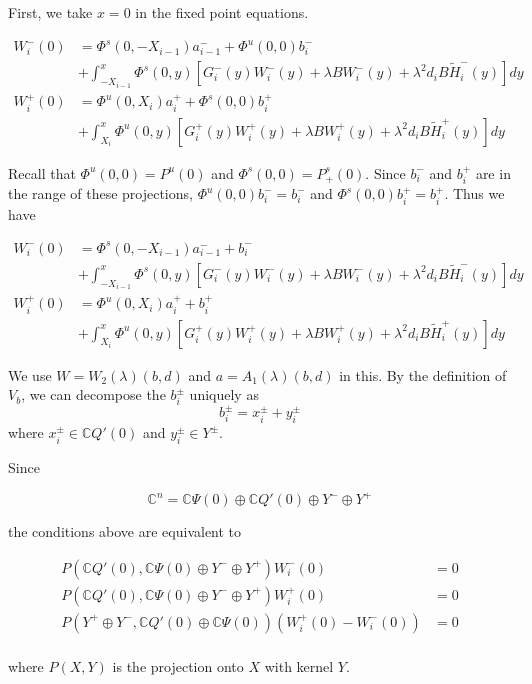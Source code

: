 \documentclass[12pt]{article}
\def\C{{\mathbb C}}
\begin{document}
First, we take $x = 0$ in the fixed point equations.

\begin{align*}
W_i^-(0) &= \Phi^s(0, -X_{i-1})a^-_{i-1} + \Phi^u(0, 0)b_i^- \\
&+ \int_{-X_{i-1}}^x \Phi^s(0, y)[G_i^-(y) W_i^-(y) + \lambda B W_i^-(y) + \lambda^2 d_i B \tilde{H}_i^-(y)] dy \\
W_i^+(0) &= \Phi^u(0, X_i)a^+_{i} + \Phi^s(0, 0)b_i^+ \\
&+ \int_{X_{i}}^x \Phi^u(0, y)[G_i^+(y) W_i^+(y) + \lambda B W_i^+(y) + \lambda^2 d_i B \tilde{H}_i^+(y) ] dy
\end{align*}

Recall that $\Phi^u(0, 0) = P^u(0)$ and $\Phi^s(0, 0) = P^s_+(0)$. Since $b_i^-$ and $b_i^+$ are in the range of these projections, $\Phi^u(0, 0)b_i^- = b_i^-$ and $\Phi^s(0, 0)b_i^+ = b_i^+ $. Thus we have

\begin{align*}
W_i^-(0) &= \Phi^s(0, -X_{i-1})a^-_{i-1} + b_i^- \\
&+ \int_{-X_{i-1}}^x \Phi^s(0, y)[G_i^-(y) W_i^-(y) + \lambda B W_i^-(y) + \lambda^2 d_i B \tilde{H}_i^-(y)] dy \\
W_i^+(0) &= \Phi^u(0, X_i)a^+_{i} + b_i^+ \\
&+ \int_{X_{i}}^x \Phi^u(0, y)[G_i^+(y) W_i^+(y) + \lambda B W_i^+(y) + \lambda^2 d_i B \tilde{H}_i^+(y) ] dy
\end{align*}

We use $W = W_2(\lambda)(b,d)$ and $a = A_1(\lambda)(b,d)$ in this. By the definition of $V_b$, we can decompose the $b_i^\pm$ uniquely as
\[
b_i^\pm = x_i^\pm + y_i^\pm
\]
where $x_i^\pm \in \C Q'(0)$ and $y_i^\pm \in Y^\pm$. 

Since

\[
\C^n = \C\Psi(0) \oplus \C Q'(0) \oplus Y^- \oplus Y^+
\]

the conditions above are equivalent to

\begin{align*}\label{projeq}
P(\C Q'(0), \C\Psi(0) \oplus Y^- \oplus Y^+)W_i^-(0) &= 0 \\
P(\C Q'(0), \C\Psi(0) \oplus Y^- \oplus Y^+)W_i^+(0) &= 0 \\
P(Y^+ \oplus Y^-, \C Q'(0) \oplus \C\Psi(0) )(W_i^+(0) - W_i^-(0)) &= 0 \\
\end{align*}

where $P(X,Y)$ is the projection onto $X$ with kernel $Y$.
\end{document}
